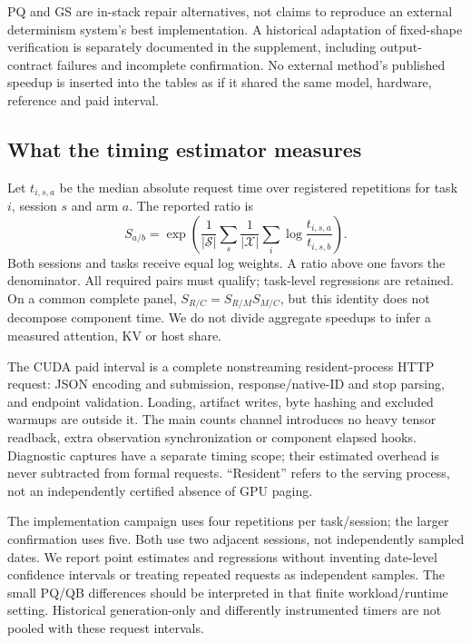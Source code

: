 PQ and GS are in-stack repair alternatives, not claims to reproduce an external determinism system's best implementation. A historical adaptation of fixed-shape verification is separately documented in the supplement, including output-contract failures and incomplete confirmation. No external method's published speedup is inserted into the tables as if it shared the same model, hardware, reference and paid interval.

\subsection{What the timing estimator measures}
Let $t_{i,s,a}$ be the median absolute request time over registered repetitions for task $i$, session $s$ and arm $a$. The reported ratio is
\begin{equation}
S_{a/b}=\exp\!\left(\frac{1}{|\mathcal S|}\sum_s
\frac{1}{|\mathcal X|}\sum_i\log\frac{t_{i,s,a}}{t_{i,s,b}}\right).
\label{eq:ratio}
\end{equation}
Both sessions and tasks receive equal log weights. A ratio above one favors the denominator. All required pairs must qualify; task-level regressions are retained. On a common complete panel, $S_{R/C}=S_{R/M}S_{M/C}$, but this identity does not decompose component time. We do not divide aggregate speedups to infer a measured attention, KV or host share.

The CUDA paid interval is a complete nonstreaming resident-process HTTP request: JSON encoding and submission, response/native-ID and stop parsing, and endpoint validation. Loading, artifact writes, byte hashing and excluded warmups are outside it. The main counts channel introduces no heavy tensor readback, extra observation synchronization or component elapsed hooks. Diagnostic captures have a separate timing scope; their estimated overhead is never subtracted from formal requests. ``Resident'' refers to the serving process, not an independently certified absence of GPU paging.

The implementation campaign uses four repetitions per task/session; the larger confirmation uses five. Both use two adjacent sessions, not independently sampled dates. We report point estimates and regressions without inventing date-level confidence intervals or treating repeated requests as independent samples. The small PQ/QB differences should be interpreted in that finite workload/runtime setting. Historical generation-only and differently instrumented timers are not pooled with these request intervals.

